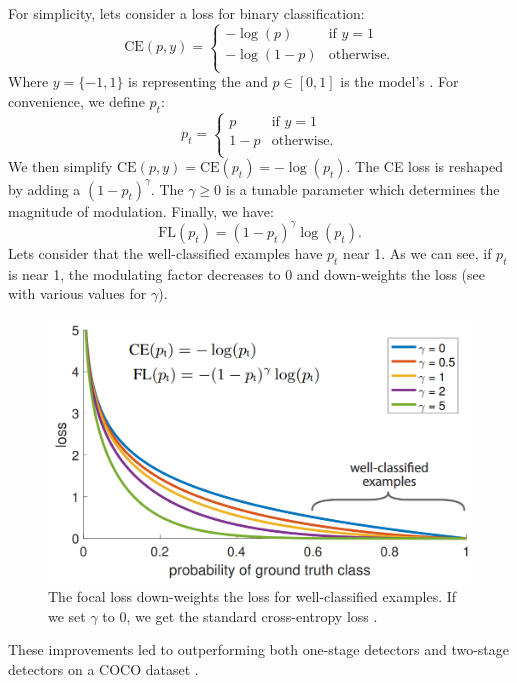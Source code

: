 For simplicity, lets consider a  loss for binary
classification:
\[
    \text{CE}(p, y) = \left\{
    \begin{array}{ll}
        -\log(p)   & \text{if } y = 1  \\
        -\log(1-p) & \text{otherwise.} \\
    \end{array}
    \right.
\]
Where $y = \{-1, 1\}$ is representing the  and
$p \in [0, 1]$ is the model's .
For convenience, we define $p_t$:
\[
    p_t = \left\{
    \begin{array}{ll}
        p   & \text{if } y = 1  \\
        1-p & \text{otherwise.} \\
    \end{array}
    \right.
\]
We then simplify $\text{CE}(p,y) = \text{CE}(p_t) = -\log(p_t)$. The CE loss is
reshaped by adding a  $(1 - p_t)^\gamma$. The
$\gamma \geq 0$ is a tunable parameter which determines the magnitude of
modulation. Finally, we have:
$$
    \text{FL}(p_t) = (1-p_t)^\gamma \log(p_t).
$$
Lets consider that the well-classified examples have $p_t$ near 1. As we can
see, if $p_t$ is near 1, the modulating factor decreases to 0 and down-weights
the loss (see  with various values for $\gamma$).

\begin{figure}[h]
    \centering
    \includegraphics[width=0.7\linewidth]{Sources/Figures/focalloss.png}
    \caption{The focal loss down-weights the loss for well-classified examples.
        If we set $\gamma$ to 0, we get the standard cross-entropy loss
        \cite{retinanet}.}
    \label{fig:focalloss}
\end{figure}

These improvements led to outperforming both one-stage detectors and two-stage
detectors on a COCO dataset \cite{coco}.